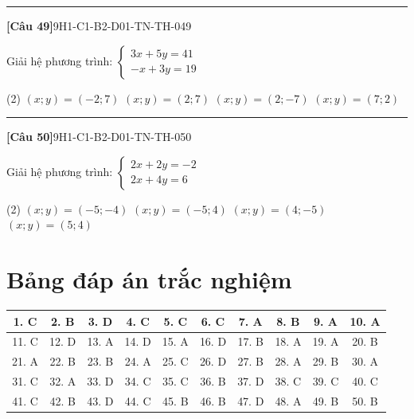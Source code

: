 \documentclass[12pt,a4paper]{article}
\newif\ifloigiai
\newenvironment{cauhoi}[2]{%
  \par\medskip\noindent\rule{\textwidth}{0.4pt}\par\nopagebreak
  \noindent\textbf{[#1]}\hfill{\scriptsize\ttfamily #2}\par\nopagebreak\smallskip}{\par}
\newcommand{\dapan}[1]{\ifloigiai\par\smallskip\noindent\textit{Đáp án:} \textbf{#1}\par\fi}
\begin{document}
\begin{cauhoi}{Câu 49}{9H1-C1-B2-D01-TN-TH-049}
Giải hệ phương trình: $\begin{cases}3x + 5y=41\\ -x + 3y=19\end{cases}$
\begin{tasks}(2)
\task $(x;y)=(-2;7)$
\task $(x;y)=(2;7)$
\task $(x;y)=(2;-7)$
\task $(x;y)=(7;2)$
\end{tasks}
\dapan{B}
\end{cauhoi}
\begin{cauhoi}{Câu 50}{9H1-C1-B2-D01-TN-TH-050}
Giải hệ phương trình: $\begin{cases}2x + 2y=-2\\ 2x + 4y=6\end{cases}$
\begin{tasks}(2)
\task $(x;y)=(-5;-4)$
\task $(x;y)=(-5;4)$
\task $(x;y)=(4;-5)$
\task $(x;y)=(5;4)$
\end{tasks}
\dapan{B}
\end{cauhoi}
\clearpage\section*{Bảng đáp án trắc nghiệm}
\begin{center}\begin{tabular}{|c|c|c|c|c|c|c|c|c|c|}
\hline
1. C & 2. B & 3. D & 4. C & 5. C & 6. C & 7. A & 8. B & 9. A & 10. A\\\hline
11. C & 12. D & 13. A & 14. D & 15. A & 16. D & 17. B & 18. A & 19. A & 20. B\\\hline
21. A & 22. B & 23. B & 24. A & 25. C & 26. D & 27. B & 28. A & 29. B & 30. A\\\hline
31. C & 32. A & 33. D & 34. C & 35. C & 36. B & 37. D & 38. C & 39. C & 40. C\\\hline
41. C & 42. B & 43. D & 44. C & 45. B & 46. B & 47. D & 48. A & 49. B & 50. B\\\hline
\end{tabular}\end{center}
\end{document}
